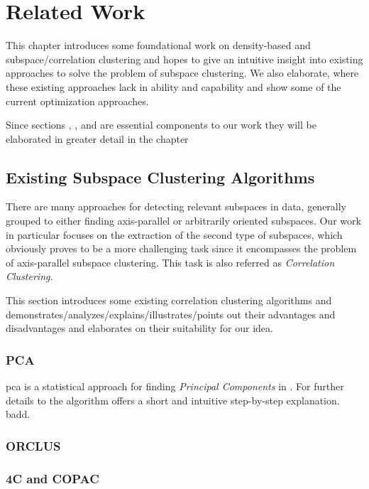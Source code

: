 \chapter{Related Work}
\label{sec:Related Work}
This chapter introduces some foundational work on density-based and subspace/correlation clustering and hopes to give an intuitive insight into existing approaches to solve the problem of subspace clustering. We also elaborate, where these existing approaches lack in ability and capability and show some of the current optimization approaches.

Since sections , ,  and  are essential components to our work they will be elaborated in greater detail in the chapter 

\section{Existing Subspace Clustering Algorithms}
There are many approaches for detecting relevant subspaces in data, generally grouped to either finding axis-parallel or arbitrarily oriented subspaces. Our work in particular focuses on the extraction of the second type of subspaces, which obviously proves to be a more challenging task since it encompasses the problem of axis-parallel subspace clustering. This task is also referred as \textit{Correlation Clustering}. 

This section introduces some existing correlation clustering algorithms and demonstrates/analyzes/explains/illustrates/points out their advantages and disadvantages and elaborates on their suitability for our idea.

\subsection{PCA}
\acrfull{pca} is a statistical approach for finding \textit{Principal Components} in  \cite{pcawold1987principal}. 
For further details to the algorithm \textcite{pcamljolliffe1986principal} offers a short and intuitive step-by-step explanation.
badd\cite{PCAshlens2014tutorial}.

\subsection{ORCLUS}

\subsection{4C and COPAC}

